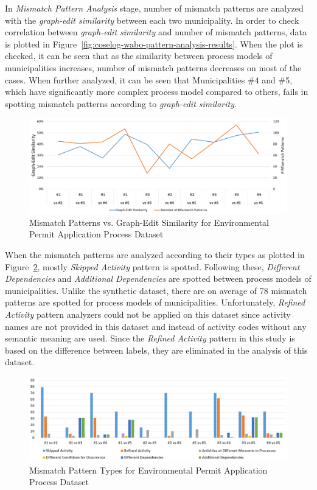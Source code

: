 In \textit{Mismatch Pattern Analysis} stage, number of mismatch patterns are analyzed with the \textit{graph-edit similarity} between each two municipality. In order to check correlation between \textit{graph-edit similarity} and number of mismatch patterns, data is plotted in Figure~\ref{fig:coselog-wabo-pattern-analysis-results}. When the plot is checked, it can be seen that as the similarity between process models of municipalities increases, number of mismatch patterns decreases on most of the cases. When further analyzed, it can be seen that Municipalities \#4 and \#5, which have significantly more complex process model compared to others, fails in spotting mismatch patterns according to \textit{graph-edit similarity}.
\begin{figure}
	\centering
	\includegraphics[width=\textwidth]{5_results_discussions/coselog-wabo/mismatch-pattern-analysis-results}
	\caption{Mismatch Patterns vs. Graph-Edit Similarity for Environmental Permit Application Process Dataset}
  \label{fig:coselog-wabo-mismatch-pattern-analysis-results}
\end{figure}
When the mismatch patterns are analyzed according to their types as plotted in Figure~\ref{fig:coselog-wabo-mismatch-pattern-types}, mostly \textit{Skipped Activity} pattern is spotted. Following these, \textit{Different Dependencies} and \textit{Additional Dependencies} are spotted between process models of municipalities. Unlike the synthetic dataset, there are on average of 78 mismatch patterns are spotted for process models of municipalities. Unfortunately, \textit{Refined Activity} pattern analyzers could not be applied on this dataset since activity names are not provided in this dataset and instead of activity codes without any semantic meaning are used. Since the \textit{Refined Activity} pattern in this study is based on the difference between labels, they are eliminated in the analysis of this dataset.
\begin{figure}
	\centering
	\includegraphics[width=\textwidth]{5_results_discussions/coselog-wabo/mismatch-pattern-types}
	\caption{Mismatch Pattern Types for Environmental Permit Application Process Dataset}
  \label{fig:coselog-wabo-mismatch-pattern-types}
\end{figure} 

